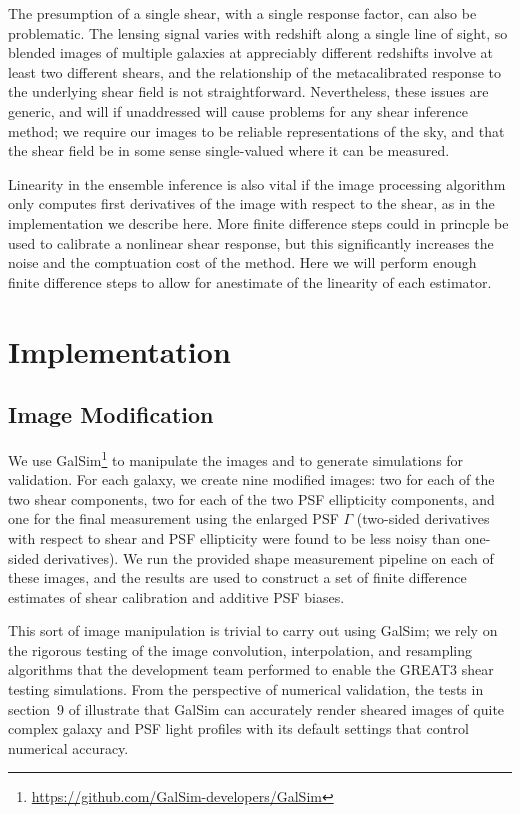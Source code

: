 \documentclass[iop]{emulateapj}
\begin{document}
The presumption of a single shear, with a single response factor, can
also be problematic. The lensing signal varies with redshift along a
single line of sight, so blended images of multiple galaxies at
appreciably different redshifts involve at least two different shears,
and the relationship of the metacalibrated response to the underlying
shear field is not straightforward. Nevertheless, these issues are
generic, and will if unaddressed will cause problems for any shear
inference method; we require our images to be reliable representations
of the sky, and that the shear field be in some sense single-valued
where it can be measured.

Linearity in the ensemble inference is also vital if the image
processing algorithm only computes first derivatives of the image with
respect to the shear, as in the implementation we describe here. More
finite difference steps could in princple be used to calibrate a
nonlinear shear response, but this significantly increases the noise
and the comptuation cost of the method. Here we will perform enough
finite difference steps to allow for anestimate of the linearity of
each estimator.


\section{Implementation}
\subsection{Image Modification}
We use
GalSim\footnote{\url{https://github.com/GalSim-developers/GalSim}} to
manipulate the images and to generate simulations for validation. For
each galaxy, we create nine modified images: two for each of the two
shear components, two for each of the two PSF ellipticity components,
and one for the final measurement using the enlarged PSF $\Gamma$
(two-sided derivatives with respect to shear and PSF ellipticity were
found to be less noisy than one-sided derivatives).  We run the
provided shape measurement pipeline on each of these images, and the
results are used to construct a set of finite difference estimates of
shear calibration and additive PSF biases.

This sort of image manipulation is trivial to carry out using GalSim;
we rely on the rigorous testing of the image convolution,
interpolation, and resampling algorithms that the development team
performed to enable the GREAT3 shear testing simulations.  From the
perspective of numerical validation, the tests in section~9 of
\cite{2015A&C....10..121R} illustrate that GalSim can accurately
render sheared images of quite complex galaxy and PSF light profiles
with its default settings that control numerical accuracy.
\end{document}
